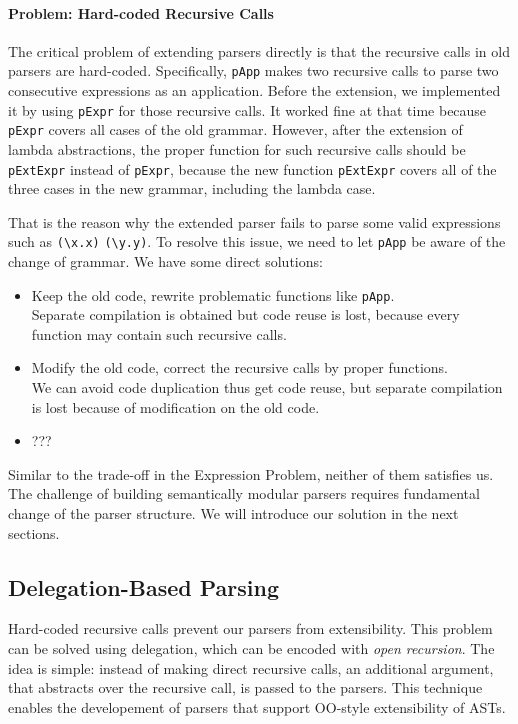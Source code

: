 \paragraph{Problem: Hard-coded Recursive Calls} The critical problem of extending parsers directly is that the recursive calls in old parsers are hard-coded. Specifically, \lstinline{pApp} makes two recursive calls to parse two consecutive expressions as an application. Before the extension, we implemented it by using \lstinline{pExpr} for those recursive calls. It worked fine at that time because \lstinline{pExpr} covers all cases of the old grammar. However, after the extension of lambda abstractions, the proper function for such recursive calls should be \lstinline{pExtExpr} instead of \lstinline{pExpr}, because the new function \lstinline{pExtExpr} covers all of the three cases in the new grammar, including the lambda case.

That is the reason why the extended parser fails to parse some valid expressions such as \lstinline{(\x.x)} \lstinline{(\y.y)}. To resolve this issue, we need to let \lstinline{pApp} be aware of the change of grammar. We have some direct solutions:

\begin{itemize}
    \item Keep the old code, rewrite problematic functions like \lstinline{pApp}. \\Separate compilation is obtained but code reuse is lost, because every function may contain such recursive calls.
    \item Modify the old code, correct the recursive calls by proper functions. \\We can avoid code duplication thus get code reuse, but separate compilation is lost because of modification on the old code.
    \item ??? 
\end{itemize}

Similar to the trade-off in the Expression Problem, neither of them satisfies us. The challenge of building semantically modular parsers requires fundamental change of the parser structure. We will introduce our solution in the next sections.

\subsection{Delegation-Based Parsing}\label{subsec:overview-firstlook}

Hard-coded recursive calls prevent our parsers from extensibility.
This problem can be solved using delegation, which can be encoded with \textit{open recursion}. The idea is
simple: instead of making direct recursive calls, an additional
argument, that abstracts over the recursive call, is passed to the
parsers. This technique enables the developement of parsers that
support OO-style extensibility of ASTs.

